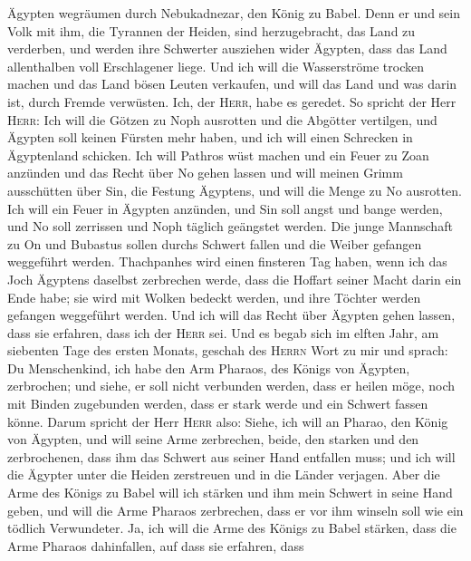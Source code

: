 Ägypten wegräumen durch Nebukadnezar, den König zu Babel.
 Denn er und sein Volk mit ihm, die Tyrannen der Heiden,
sind herzugebracht, das Land zu verderben, und werden ihre Schwerter
ausziehen wider Ägypten, dass das Land allenthalben voll Erschlagener
liege.  Und ich will die Wasserströme trocken machen und
das Land bösen Leuten verkaufen, und will das Land und was darin ist,
durch Fremde verwüsten. Ich, der \textsc{Herr}, habe es geredet.
 So spricht der Herr \textsc{Herr}: Ich will die Götzen
zu Noph ausrotten und die Abgötter vertilgen, und Ägypten soll keinen
Fürsten mehr haben, und ich will einen Schrecken in Ägyptenland
schicken.  Ich will Pathros wüst machen und ein Feuer zu
Zoan anzünden und das Recht über No gehen lassen  und
will meinen Grimm ausschütten über Sin, die Festung Ägyptens, und will
die Menge zu No ausrotten.  Ich will ein Feuer in Ägypten
anzünden, und Sin soll angst und bange werden, und No soll zerrissen und
Noph täglich geängstet werden.  Die junge Mannschaft zu
On und Bubastus sollen durchs Schwert fallen und die Weiber gefangen
weggeführt werden.  Thachpanhes wird einen finsteren Tag
haben, wenn ich das Joch Ägyptens daselbst zerbrechen werde, dass die
Hoffart seiner Macht darin ein Ende habe; sie wird mit Wolken bedeckt
werden, und ihre Töchter werden gefangen weggeführt werden.
 Und ich will das Recht über Ägypten gehen lassen, dass
sie erfahren, dass ich der \textsc{Herr} sei.  Und es
begab sich im elften Jahr, am siebenten Tage des ersten Monats, geschah
des \textsc{Herrn} Wort zu mir und sprach:  Du
Menschenkind, ich habe den Arm Pharaos, des Königs von Ägypten,
zerbrochen; und siehe, er soll nicht verbunden werden, dass er heilen
möge, noch mit Binden zugebunden werden, dass er stark werde und ein
Schwert fassen könne.  Darum spricht der Herr
\textsc{Herr} also: Siehe, ich will an Pharao, den König von Ägypten,
und will seine Arme zerbrechen, beide, den starken und den zerbrochenen,
dass ihm das Schwert aus seiner Hand entfallen muss;  und
ich will die Ägypter unter die Heiden zerstreuen und in die Länder
verjagen.  Aber die Arme des Königs zu Babel will ich
stärken und ihm mein Schwert in seine Hand geben, und will die Arme
Pharaos zerbrechen, dass er vor ihm winseln soll wie ein tödlich
Verwundeter.  Ja, ich will die Arme des Königs zu Babel
stärken, dass die Arme Pharaos dahinfallen, auf dass sie erfahren, dass
